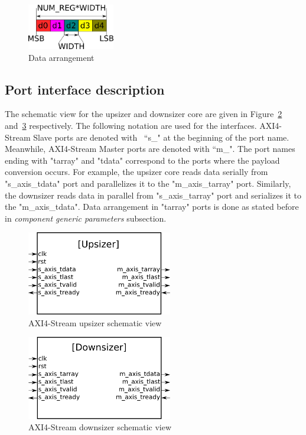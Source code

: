 \documentclass[10pt, conference, compsocconf]{IEEEtran}
\begin{document}
\begin{figure}[!t]
\centering
\includegraphics[width=1.5in]{images/tarray.png}
\caption{Data arrangement}
\label{tarray}
\end{figure}

\subsection{Port interface description}

The schematic view for the upsizer and downsizer core are given in Figure~\ref{axis2pblock} and~\ref{axip2sblock} respectively. The following notation are used for the interfaces. AXI4-Stream Slave ports are denoted with \ ``s\_" at the beginning of the port name. Meanwhile, AXI4-Stream Master ports are denoted with ``m\_". The port names ending with "tarray" and "tdata" correspond to the ports where the payload conversion occurs. For example, the upsizer core reads data serially from "s\_axis\_tdata" port and parallelizes it to the "m\_axis\_tarray" port. Similarly, the downsizer reads data in parallel from "s\_axis\_tarray" port and serializes it to the "m\_axis\_tdata". Data arrangement in "tarray" ports is done as stated before in {\it component generic parameters} subsection.

\begin{figure}[!t]
\centering
\includegraphics[width=2.5in]{images/upsizer.png}
\caption{AXI4-Stream upsizer schematic view}
\label{axis2pblock}
\end{figure}

\begin{figure}[!t]
\centering
\includegraphics[width=2.5in]{images/downsizer.png}
\caption{AXI4-Stream downsizer schematic view}
\label{axip2sblock}
\end{figure}
\end{document}
